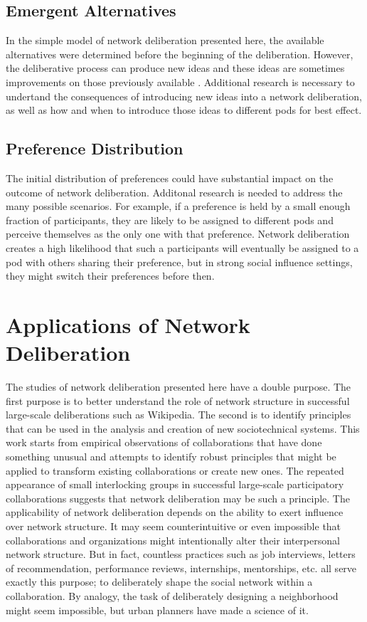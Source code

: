 \subsection{Emergent Alternatives}
In the simple model of network deliberation presented here, the available alternatives were determined before the beginning of the deliberation.
However, the deliberative process can produce new ideas and these ideas are sometimes improvements on those previously available \cite{salganik_wiki_2015}.
Additional research is necessary to undertand the consequences of introducing new ideas into a network deliberation, as well as how and when to introduce those ideas to different pods for best effect.

\subsection{Preference Distribution}
The initial distribution of preferences could have substantial impact on the outcome of network deliberation.
Additonal research is needed to address the many possible scenarios.
For example, if a preference is held by a small enough fraction of participants, they are likely to be assigned to different pods and perceive themselves as the only one with that preference.
Network deliberation creates a high likelihood that such a participants will eventually
be assigned to a pod with others sharing their preference, but in strong social influence settings, they might switch their preferences before then.

\section{Applications of Network Deliberation}
The studies of network deliberation presented here have a double purpose.
The first purpose is to better understand the role of network structure in successful large-scale deliberations such as Wikipedia.
The second is to identify principles that can be used in the analysis and creation of new sociotechnical systems.
This work starts from empirical observations of collaborations that have done something unusual and attempts to identify robust principles that might be applied to transform existing collaborations or create new ones.
The repeated appearance of small interlocking groups in successful large-scale participatory collaborations suggests that network deliberation may be such a principle.
The applicability of network deliberation depends on the ability to exert influence over network structure.
It may seem counterintuitive or even impossible that collaborations and organizations might intentionally alter their interpersonal network structure.
But in fact, countless practices such as job interviews, letters of recommendation,
performance reviews, internships, mentorships, etc. all serve exactly this purpose;
to deliberately shape the social network within a collaboration.
By analogy, the task of deliberately designing a neighborhood might seem impossible,
but urban planners have made a science of it.

